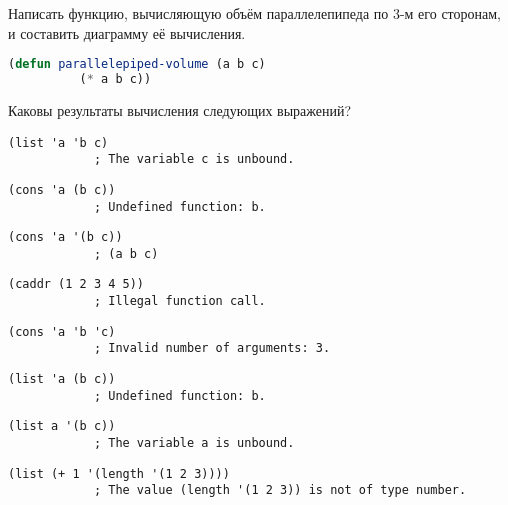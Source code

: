 \documentclass[a4paper,oneside,12pt]{extreport}
\begin{document}
\begin{task}
	Написать функцию, вычисляющую объём параллелепипеда по 3-м его сторонам, и составить диаграмму её вычисления.

	\begin{lstlisting}[language=Lisp, gobble=16]
		(defun parallelepiped-volume (a b c)
		  (* a b c))
	\end{lstlisting}
\end{task}

\begin{task}
	Каковы результаты вычисления следующих выражений?
	\begin{AutoMultiColEnumerate}
		\item \begin{lstlisting}[style=lispinline, gobble=24]
			(list 'a 'b c)
			; The variable c is unbound.
		\end{lstlisting}

		\item \begin{lstlisting}[style=lispinline, gobble=24]
			(cons 'a (b c))
			; Undefined function: b.
		\end{lstlisting}

		\item \begin{lstlisting}[style=lispinline, gobble=24]
			(cons 'a '(b c))
			; (a b c)
		\end{lstlisting}

		\item \begin{lstlisting}[style=lispinline, gobble=24]
			(caddr (1 2 3 4 5))
			; Illegal function call.
		\end{lstlisting}

		\item \begin{lstlisting}[style=lispinline, gobble=24]
			(cons 'a 'b 'c)
			; Invalid number of arguments: 3.
		\end{lstlisting}

		\item \begin{lstlisting}[style=lispinline, gobble=24]
			(list 'a (b c))
			; Undefined function: b.
		\end{lstlisting}

		\item \begin{lstlisting}[style=lispinline, gobble=24]
			(list a '(b c))
			; The variable a is unbound.
		\end{lstlisting}

		\item \begin{lstlisting}[style=lispinline, gobble=24]
			(list (+ 1 '(length '(1 2 3))))
			; The value (length '(1 2 3)) is not of type number.
		\end{lstlisting}
	\end{AutoMultiColEnumerate}
\end{task}
\end{document}
